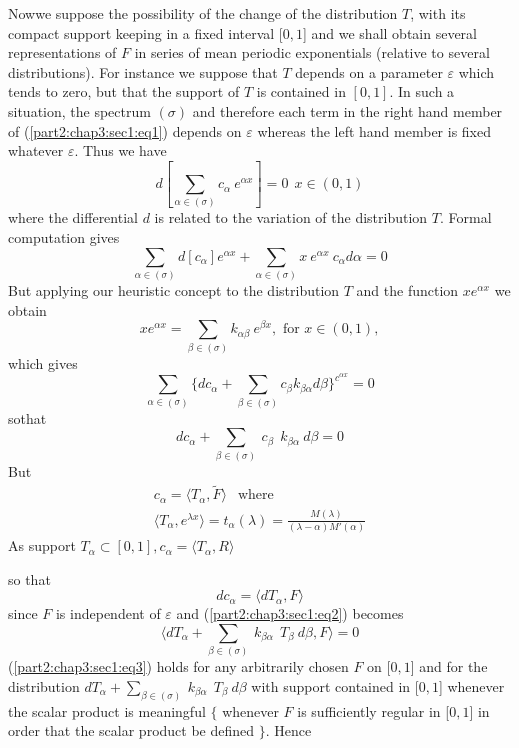 Now\pageoriginale we suppose the possibility of the change of the distribution $T$,
with its compact support keeping in a fixed interval [$0, 1$] and we
shall obtain several representations of $F$ in series of mean periodic
exponentials (relative to several distributions). For instance we
suppose that $T$ depends on a parameter $\varepsilon$ which tends to zero, but
that the support of $T$ is contained in $[0, 1]$. In such a situation,
the spectrum $(\sigma)$ and therefore each term in the right hand
member of (\ref{part2:chap3:sec1:eq1}) depends on $\varepsilon$
whereas the left hand member is fixed whatever $\varepsilon$. Thus we have 
$$
d \left[ \sum_{\alpha \in (\sigma )} c_\alpha ~ e^{\alpha x} \right] =
0 ~~ x \in (0, 1) 
$$
where the differential $d$ is related to the variation of the
distribution $T$. Formal computation gives 
$$
\sum_{\alpha \in (\sigma )} d [c_\alpha ] e^{\alpha x} + \sum_{\alpha
  \in (\sigma )} x ~ e^{\alpha x} ~ c_\alpha d \alpha= 0 
$$
But applying our heuristic concept to the distribution $T$ and the
function $xe^{\alpha x}$ we obtain 
$$
xe^{\alpha x} = \sum_{\beta \in (\sigma )} k_{\alpha \beta} ~ e^{\beta
  x},  \text{ for } x \in (0, 1), 
$$
which gives 
$$
\sum_{\alpha \in (\sigma )} \Bigg\{ dc_\alpha + \sum_{\beta \in
  (\sigma )} c_\beta k_{\beta \alpha} d \beta \Bigg\}^{c^{\alpha x}} = 0 
$$ 
so\pageoriginale that 
\begin{equation*}
  dc_\alpha + \sum_{\beta \in (\sigma )} ~  c_\beta ~~  k_{\beta
    \alpha} ~ d\beta = 0 \tag{2}\label{part2:chap3:sec1:eq2} 
\end{equation*}
But 
\begin{gather*}
  c_\alpha = \langle T_\alpha,  \tilde{F} \rangle ~~\text{ where } \\
  \langle T_\alpha,  e^{\lambda x} \rangle = t_\alpha (\lambda ) =
  \frac{M(\lambda )}{(\lambda - \alpha ) M' (\alpha )} 
\end{gather*}
As support $T_\alpha \subset [0, 1],  c_\alpha = \langle T_\alpha,  R \rangle $

\medskip
\noindent
so that
$$
dc_\alpha = \langle dT_\alpha,  F \rangle
$$
since $F$ is independent of $\varepsilon$ and
(\ref{part2:chap3:sec1:eq2}) becomes 
\begin{equation}
  \langle dT_\alpha + \sum_{\beta \in (\sigma )} ~ k_{\beta \alpha }
  ~~ T_\beta ~ d\beta,  F \rangle = 0 \tag{3}\label{part2:chap3:sec1:eq3} 
\end{equation}
(\ref{part2:chap3:sec1:eq3}) holds for any arbitrarily chosen $F$ on [$0, 1$] and for the
distribution $dT_\alpha + \sum\limits_{\beta \in (\sigma )} ~k_{\beta
  \alpha } ~~ T_\beta ~ d\beta $ with support contained in [$0, 1$]
whenever the scalar product is meaningful $\Big\{$ whenever $F$ is
sufficiently regular in [$0, 1$] in order that the scalar product be\pageoriginale
defined $\Big\}$. Hence 

